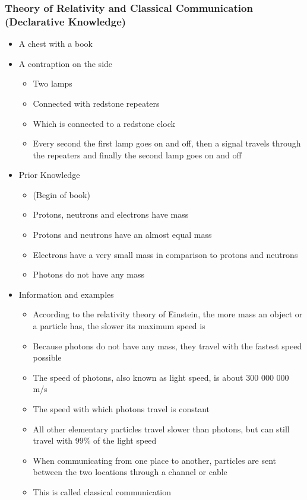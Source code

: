 \documentclass[11pt,twoside]{report} %
\begin{document}
\subsubsection{Theory of Relativity and Classical Communication (Declarative Knowledge)}
	\begin{itemize}
		\item A chest with a book
		\item A contraption on the side
		\begin{itemize}
			\item Two lamps
			\item Connected with redstone repeaters
			\item Which is connected to a redstone clock
			\item Every second the first lamp goes on and off, then a signal travels through the repeaters and finally the second lamp goes on and off
		\end{itemize}
		\item Prior Knowledge
		\begin{itemize}
			\item (Begin of book)
			\item Protons, neutrons and electrons have mass
			\item Protons and neutrons have an almost equal mass
			\item Electrons have a very small mass in comparison to protons and neutrons
			\item Photons do not have any mass
		\end{itemize}
		\item Information and examples
		\begin{itemize}
			\item According to the relativity theory of Einstein, the more mass an object or a particle has, the slower its maximum speed is
			\item Because photons do not have any mass, they travel with the fastest speed possible
			\item The speed of photons, also known as light speed, is about 300 000 000 m/s
			\item The speed with which photons travel is constant
			\item All other elementary particles travel slower than photons, but can still travel with 99\% of the light speed
			\item When communicating from one place to another, particles are sent between the two locations through a channel or cable
			\item This is called classical communication

\end{itemize}
\end{itemize}
\end{document}
